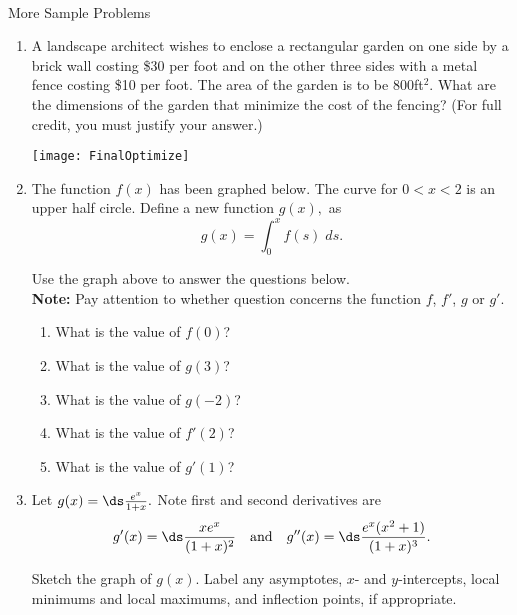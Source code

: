 \documentclass[11pt,fleqn]{article}
\newcommand{\bc}{\begin{center}}
\newcommand{\ec}{\end{center}}
\begin{document}
\vspace*{-0.7in}

\begin{center}
  \large
  \\
\end{center}


\bc More  Sample Problems \ec
\begin{enumerate}
\item A landscape architect wishes to enclose a rectangular garden on
one side by a brick wall costing \$30 per foot and on the
other three sides with a metal fence costing \$10 per foot.
The area of the garden is to be 800ft$^2$.  What
are the dimensions of the garden that minimize the cost of the fencing? (For full credit, you must justify your answer.)

\hfil\texttt{[image: FinalOptimize]}
\newpage
 \item The function $f(x)$ has been graphed below.
The curve for $0<x<2$ is an upper half circle.
Define a new function $g(x),$ as
$$
g(x) =\int_0^x f(s)\; ds.
$$

\hfil{}

Use the graph above to answer the questions below. \\
\textbf{Note:} Pay attention to whether question concerns the function $f$, $f'$, $g$ or $g'.$
\begin{enumerate}
\item  What is the value of $f(0)$?  
\vfill
\item  What is the value of $g(3)$? 
\vfill
\item  What is the value of $g(-2)$? 
\vfill
\item  What is the value of $f'(2)$? 
\vfill
\item  What is the value of $g'(1)$? 
\vfill
\end{enumerate}
\newpage
\item Let $g(x)=\ds\frac{e^{x}}{1+x}.$ Note first and second derivatives are $$g'(x)=\ds\frac{xe^{x}}{(1+x)^{2}} \quad \text{and} \quad g''(x)=\ds\frac{e^{x}(x^{2}+1)}{(1+x)^{3}}.$$ 

Sketch the graph of $g(x).$ Label any asymptotes, $x$- and $y$-intercepts, local minimums and local maximums, and inflection points, if appropriate.\\

\end{enumerate}
\end{document}
